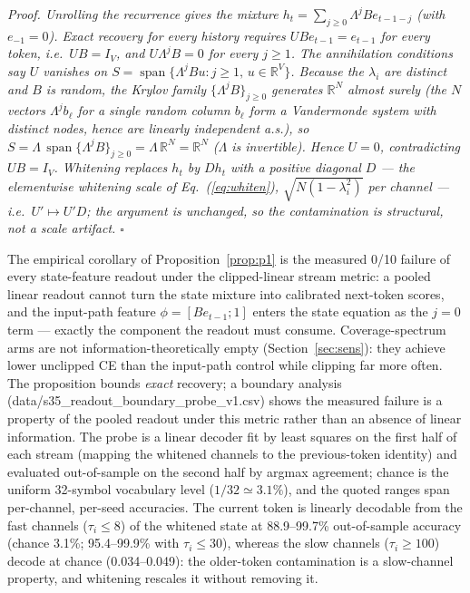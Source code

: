 \documentclass[preprint,12pt]{elsarticle}
\newcounter{proposition}[section]
\newenvironment{proof}{\noindent\itshape Proof.}{\hfill$\square$\par\medskip}
\begin{document}
\begin{proof}
Unrolling the recurrence gives the mixture
$h_t = \sum_{j\ge0} \Lambda^j B e_{t-1-j}$ (with $e_{-1} = 0$). Exact
recovery for every history requires
$U B e_{t-1} = e_{t-1}$ for every token, i.e.\ $U B = I_V$, and
$U \Lambda^j B = 0$ for every $j \ge 1$. The annihilation conditions say
$U$ vanishes on $S = \operatorname{span}\{\Lambda^j B u : j \ge 1,\,
u \in \mathbb{R}^V\}$. Because the $\lambda_i$ are distinct and $B$ is
random, the Krylov family $\{\Lambda^j B\}_{j\ge0}$ generates
$\mathbb{R}^N$ almost surely (the $N$ vectors $\Lambda^{j} b_\ell$ for a
single random column $b_\ell$ form a Vandermonde system with distinct
nodes, hence are linearly independent a.s.), so
$S = \Lambda\,\operatorname{span}\{\Lambda^j B\}_{j\ge0} =
\Lambda\,\mathbb{R}^N = \mathbb{R}^N$ ($\Lambda$ is invertible). Hence
$U = 0$, contradicting $U B = I_V$. Whitening replaces $h_t$ by
$D h_t$ with a positive diagonal $D$ --- the elementwise whitening
scale of Eq.~(\ref{eq:whiten}), $\sqrt{N(1-\lambda_i^2)}$ per channel
--- i.e.\ $U' \mapsto U' D$; the
argument is unchanged, so the contamination is structural, not a scale
artifact.
\end{proof}

The empirical corollary of Proposition~\ref{prop:p1} is the measured
0/10 failure of every state-feature readout under the clipped-linear
stream metric: a pooled linear readout
cannot turn the state mixture into calibrated next-token scores, and
the input-path feature $\phi = [B e_{t-1}; 1]$ enters the state
equation as the $j{=}0$ term --- exactly the component the readout must
consume. Coverage-spectrum arms are not information-theoretically empty
(Section~\ref{sec:sens}): they achieve lower unclipped CE than the
input-path control while clipping far more often. The proposition
bounds \emph{exact} recovery; a boundary
analysis (data/s35\_readout\_boundary\_probe\_v1.csv) shows the
measured failure is a property of the pooled readout under this metric
rather than an absence of linear information. The probe is a linear
decoder fit by least squares on the first half of each stream (mapping
the whitened channels to the previous-token identity) and evaluated
out-of-sample on the second half by argmax agreement; chance is the
uniform 32-symbol vocabulary level ($1/32 \simeq 3.1\%$), and the
quoted ranges span per-channel, per-seed accuracies. The current token
is
linearly decodable from the fast channels ($\tau_i \le 8$) of the
whitened state at 88.9--99.7\% out-of-sample accuracy (chance 3.1\%;
95.4--99.9\% with $\tau_i \le 30$), whereas the slow channels
($\tau_i \ge 100$) decode at chance (0.034--0.049): the older-token
contamination is a slow-channel property, and whitening rescales it
without removing it.
\end{document}

